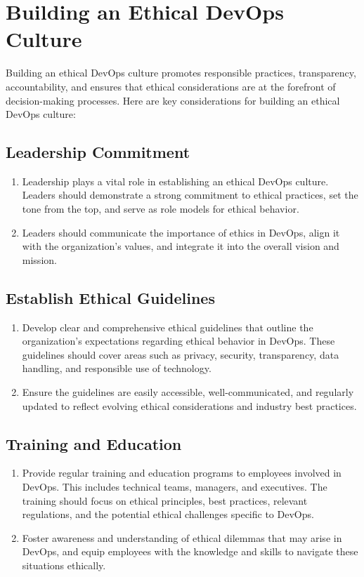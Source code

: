 \chapter{Building an Ethical DevOps Culture}

Building an ethical DevOps culture promotes responsible practices, transparency, accountability, and ensures that ethical considerations are at the forefront of decision-making processes. Here are key considerations for building an ethical DevOps culture:

\section*{Leadership Commitment}
        \begin{enumerate}
            \item Leadership plays a vital role in establishing an ethical DevOps culture. Leaders should demonstrate a strong commitment to ethical practices, set the tone from the top, and serve as role models for ethical behavior.
        
            \item Leaders should communicate the importance of ethics in DevOps, align it with the organization's values, and integrate it into the overall vision and mission.
        \end{enumerate}
    
\section*{Establish Ethical Guidelines}
        \begin{enumerate}
            \item Develop clear and comprehensive ethical guidelines that outline the organization's expectations regarding ethical behavior in DevOps. These guidelines should cover areas such as privacy, security, transparency, data handling, and responsible use of technology.
            
            \item Ensure the guidelines are easily accessible, well-communicated, and regularly updated to reflect evolving ethical considerations and industry best practices.
        \end{enumerate}

\section*{Training and Education}
        \begin{enumerate}
            \item Provide regular training and education programs to employees involved in DevOps. This includes technical teams, managers, and executives. The training should focus on ethical principles, best practices, relevant regulations, and the potential ethical challenges specific to DevOps.
            
            \item Foster awareness and understanding of ethical dilemmas that may arise in DevOps, and equip employees with the knowledge and skills to navigate these situations ethically.
        \end{enumerate}
    
